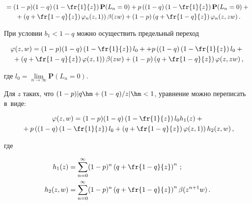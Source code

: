 \noindent

\begin{multline*}

{}=(1-p)(1-q)\left(1-\fr{1}{z}\right)\mathbf{P}(L_n=0)+

p\left((1-q)\left(1-\fr{1}{z}\right)\mathbf{P}(L_n=0)+{}\right.\\

\left.{}+

\left(q+\fr{1-q}{z}\right)\varphi_n(z,1)\right)\beta(zw)+

(1-p)\left(q+\fr{1-q}{z}\right)\varphi_n(z,zw)\,.

\end{multline*}

При условии $b_1<1-q$ можно осуществить предельный переход

\begin{multline*}

\varphi(z,w)=(1-p)(1-q)\left(1-\fr{1}{z}\right)l_0+

+p\left((1-q)\left(1-\fr{1}{z}\right)l_0+{}\right.\\

\left.{}+\left(q+\fr{1-q}{z}\right)\varphi(z,1)

\right)\beta(zw)+(1-p)\left(q+\fr{1-q}{z}\right)\varphi(z,zw)\,,

\end{multline*}

где $l_0=\lim\limits_{n\to\infty}\mathbf{P}(L_n=0)$.

Для $z$ таких, что $(1-p)|q\hm+(1-q)/z|\hm<1$, уравнение можно переписать в~виде:

\begin{multline}

\varphi(z,w)=(1-p)(1-q)\left(1-\fr{1}{z}\right)l_0 h_1(z)+{}\\

{}+p\left((1-q)\left(1-\fr{1}{z}\right)l_0+\left(q+\fr{1-q}{z}\right)

\varphi(z,1)\right)h_2(z,w)\,,

\label{zw}

\end{multline}

где

\begin{align*}

h_1(z)&=\sum\limits_{n=0}^{\infty}(1-p)^n\left(q+\fr{1-q}{z}\right)^n\,;\\

h_2(z,w)&=\sum\limits_{n=0}^{\infty}(1-p)^n\left(q+\fr{1-q}{z}\right)^n\beta(z^{n+1}w)\,.

\end{align*}



